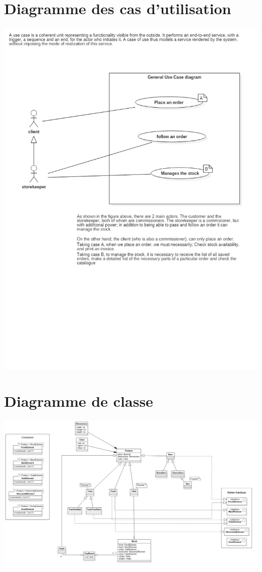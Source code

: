 \documentclass{ecam}
\begin{document}
\section{Diagramme des cas d'utilisation}
\begin{center}
\includegraphics[angle=0,scale=0.5]{../images/use-case-diagram.png}
\end{center}

\section{Diagramme de classe}
\begin{center}
\includegraphics[angle=270,scale=0.35]{../images/class-diagram.png}
\end{center}
\end{document}
